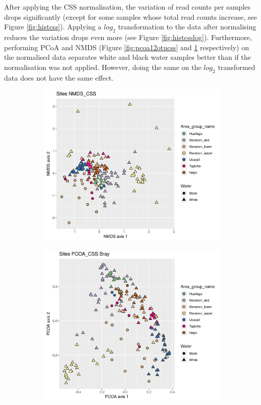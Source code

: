 After applying the CSS normalisation, the variation of read counts per samples drops significantly (except for some samples whose total read counts increase, see Figure \ref{fig:histcss}). Applying a $log_2$ transformation to the data after normalising reduces the variation drops even more (see Figure \ref{fig:histcsslog}). Furthermore, performing PCoA and NMDS (Figure \ref{fig:pcoa12otucss} and \ref{fig:nmds12otucss} respectively) on the normalised data separates white and black water samples better than if the normalisation was not applied. However, doing the same on the $log_2$ transformed data does not have the same effect.

\begin{figure}[h]
	\centering
	\begin{subfigure}{0.4\textwidth}
		\centering
		\includegraphics[width = \textwidth]{nmds12otucss}
		\caption{}
		\label{fig:nmds12otucss}
	\end{subfigure}
	\begin{subfigure}{0.4\textwidth}
		\centering
		\includegraphics[width = \textwidth]{pcoa12otucss}

\end{subfigure}
\end{figure}
